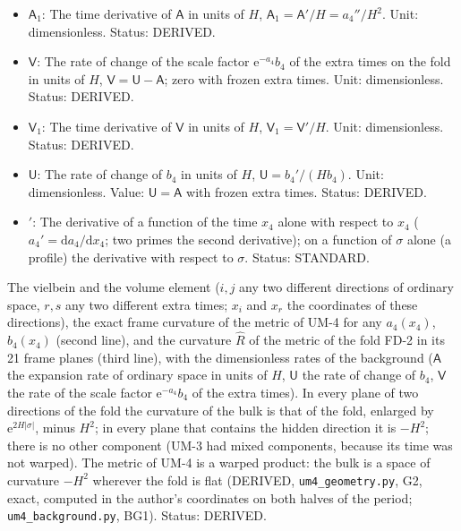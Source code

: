 \documentclass[
  10pt,
]{article}
\begin{document}
\begin{itemize}
  constant); the first-order equations of the fold hold for
  \(\mathsf{A}^2 \ll 1\); 1 at the author's vacuum, which is not a
  solution of UM-4. Status: DERIVED.
\item
  \(\mathsf{A}_1\): The time derivative of \(\mathsf{A}\) in units of
  \(H\), \(\mathsf{A}_1 = \mathsf{A}'/H = a_4''/H^2\). Unit:
  dimensionless. Status: DERIVED.
\item
  \(\mathsf{V}\): The rate of change of the scale factor
  \(\mathrm{e}^{-a_4}b_4\) of the extra times on the fold in units of
  \(H\), \(\mathsf{V} = \mathsf{U} - \mathsf{A}\); zero with frozen
  extra times. Unit: dimensionless. Status: DERIVED.
\item
  \(\mathsf{V}_1\): The time derivative of \(\mathsf{V}\) in units of
  \(H\), \(\mathsf{V}_1 = \mathsf{V}'/H\). Unit: dimensionless. Status:
  DERIVED.
\item
  \(\mathsf{U}\): The rate of change of \(b_4\) in units of \(H\),
  \(\mathsf{U} = b_4'/(Hb_4)\). Unit: dimensionless. Value:
  \(\mathsf{U} = \mathsf{A}\) with frozen extra times. Status: DERIVED.
\item
  \({}'\): The derivative of a function of the time \(x_4\) alone with
  respect to \(x_4\) (\(a_4' = \mathrm{d}a_4/\mathrm{d}x_4\); two primes
  the second derivative); on a function of \(\sigma\) alone (a profile)
  the derivative with respect to \(\sigma\). Status: STANDARD.
\end{itemize}

The vielbein and the volume element (\(i, j\) any two different
directions of ordinary space, \(r, s\) any two different extra times;
\(x_i\) and \(x_r\) the coordinates of these directions), the exact
frame curvature of the metric of UM-4 for any \(a_4(x_4)\), \(b_4(x_4)\)
(second line), and the curvature \(\hat R\) of the metric of the fold
FD-2 in its 21 frame planes (third line), with the dimensionless rates
of the background (\(\mathsf{A}\) the expansion rate of ordinary space
in units of \(H\), \(\mathsf{U}\) the rate of change of \(b_4\),
\(\mathsf{V}\) the rate of the scale factor \(\mathrm{e}^{-a_4}b_4\) of
the extra times). In every plane of two directions of the fold the
curvature of the bulk is that of the fold, enlarged by
\(\mathrm{e}^{2H\lvert\sigma\rvert}\), minus \(H^2\); in every plane
that contains the hidden direction it is \(-H^2\); there is no other
component (UM-3 had mixed components, because its time was not warped).
The metric of UM-4 is a warped product: the bulk is a space of curvature
\(-H^2\) wherever the fold is flat (DERIVED, \texttt{um4\_geometry.py},
G2, exact, computed in the author's coordinates on both halves of the
period; \texttt{um4\_background.py}, BG1). Status: DERIVED.
\end{document}
